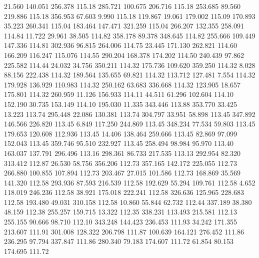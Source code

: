   21.560  140.051  256.378       115.18
 285.721  100.675  206.716       115.18
 253.685   89.560  219.886       115.18
 356.953   67.603    9.990       115.18
 119.867   19.061  179.002       115.09
 170.893   35.223  260.341       115.04
 183.464  147.471  321.259       115.04
 266.207  132.355  258.091       114.84
  11.722   29.961   38.505       114.82
 358.178   89.378  348.645       114.82
 255.666  109.449  147.336       114.81
 302.936   96.815  264.006       114.75
  23.445  171.130  262.821       114.60
 166.209  116.247  115.076       114.55
 290.204  168.378  174.202       114.50
 240.439   97.862  225.582       114.44
  24.032   34.756  350.211       114.32
 175.736  109.620  359.250       114.32
   8.028   88.156  222.438       114.32
 189.564  135.655   69.821       114.32
 113.712  127.481    7.554       114.32
 179.928  136.929  110.983       114.32
 250.162   63.683  336.668       114.32
 123.905   18.657  175.801       114.32
 260.959   11.126  156.933       114.11
  44.511   61.296  102.604       114.10
 152.190   30.735  153.149       114.10
 195.030   11.335  343.446       113.88
 353.770   33.425   13.223       113.74
 295.448   22.086  130.381       113.74
 304.797   33.951   58.898       113.45
 347.892  146.566  226.820       113.45
   6.849  117.250  244.869       113.45
 348.234   77.534   59.803       113.45
 179.653  120.608  112.936       113.45
  14.406  138.464  259.666       113.45
  82.869   97.099  152.043       113.45
 359.746   95.510  232.927       113.45
 258.494   98.984   95.970       113.40
 163.037  137.791  296.496       113.16
 298.361   86.733  217.535       113.13
 292.954   82.320  313.412       112.87
  26.530   58.756  356.206       112.73
 357.165  142.172  225.055       112.73
 266.880  100.855  107.894       112.73
 203.467   27.015  101.586       112.73
 168.869   35.569  141.320       112.58
 293.936   87.593  216.539       112.58
 192.629   55.294  109.761       112.58
   4.652  118.019  246.236       112.58
  38.921  175.018  222.241       112.58
 326.636  125.965  228.683       112.58
 193.480   49.031  310.158       112.58
  10.860   55.844   62.732       112.44
 337.189   38.380   48.159       112.38
 255.257  159.715   13.322       112.35
 338.231  113.493  215.581       112.13
 255.155   90.666   98.710       112.10
 343.248  144.423  236.453       111.93
  34.242  171.355  213.607       111.91
 301.008  128.322  206.798       111.87
 100.639  164.121  276.452       111.86
 236.295   97.794  337.847       111.86
 280.340   79.183  174.607       111.72
  61.854   80.153  174.695       111.72

